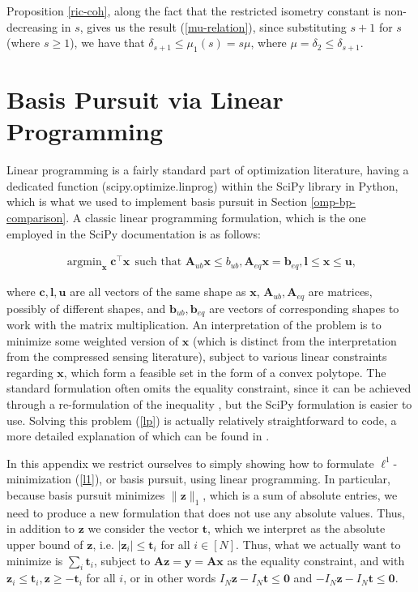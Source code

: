 \documentclass[12pt,a4paper]{amsart}
\numberwithin{equation}{section}
\theoremstyle{plain}
\theoremstyle{definition}
\newcommand{\bdy}{\mathbf{y}}
\newcommand{\bdx}{\mathbf{x}}
\newcommand{\bdz}{\mathbf{z}}
\newcommand{\bdb}{\mathbf{b}}
\newcommand{\bdu}{\mathbf{u}}
\newcommand{\bdc}{\mathbf{c}}
\newcommand{\bdl}{\mathbf{l}}
\newcommand{\bdt}{\mathbf{t}}
\newcommand{\bdA}{\mathbf{A}}
\DeclareMathOperator{\argmin}{argmin}
\begin{document}
\begin{appendices}
Proposition \ref{ric-coh}, along the fact that the restricted isometry constant is non-decreasing in $s$, gives us the result (\ref{mu-relation}), since substituting $s+1$ for $s$ (where $s\geq1$), we have that $\delta_{s+1}\leq\mu_1(s)=s\mu$, where $\mu=\delta_2\leq\delta_{s+1}$.

\section{Basis Pursuit via Linear Programming}\label{lin-prog}

Linear programming is a fairly standard part of optimization literature, having a dedicated function (scipy.optimize.linprog) within the SciPy library in Python, which is what we used to implement basis pursuit in Section \ref{omp-bp-comparison}. A classic linear programming formulation, which is the one employed in the SciPy documentation is as follows:

\begin{align}\label{lp}
    \argmin_\bdx \bdc^\top\bdx \ \ \text{such that }\bdA_{ub}\bdx\leq b_{ub},\bdA_{eq}\bdx=\bdb_{eq},\bdl\leq\bdx\leq\bdu,
\end{align}

where $\bdc,\bdl,\bdu$ are all vectors of the same shape as $\bdx$, $\bdA_{ub},\bdA_{eq}$ are matrices, possibly of different shapes, and $\bdb_{ub},\bdb_{eq}$ are vectors of corresponding shapes to work with the matrix multiplication. An interpretation of the problem is to minimize some weighted version of $\bdx$ (which is distinct from the interpretation from the compressed sensing literature), subject to various linear constraints regarding $\bdx$, which form a feasible set in the form of a convex polytope. The standard formulation often omits the equality constraint, since it can be achieved through a re-formulation of the inequality \cite{chvatal}, but the SciPy formulation is easier to use. Solving this problem (\ref{lp}) is actually relatively straightforward to code, a more detailed explanation of which can be found in \cite{chvatal}.

In this appendix we restrict ourselves to simply showing how to formulate $\ell^1$-minimization (\ref{l1}), or basis pursuit, using linear programming. In particular, because basis pursuit minimizes $\|\bdz\|_1$, which is a sum of absolute entries, we need to produce a new formulation that does not use any absolute values. Thus, in addition to $\bdz$ we consider the vector $\bdt$, which we interpret as the absolute upper bound of $\bdz$, i.e. $|\bdz_i|\leq \bdt_i$ for all $i\in[N]$. Thus, what we actually want to minimize is $\sum_i\bdt_i$, subject to $\bdA\bdz=\bdy=\bdA\bdx$ as the equality constraint, and with $\bdz_i\leq\bdt_i,\bdz\geq-\bdt_i$ for all $i$, or in other words $I_N\bdz-I_N\bdt\leq\mathbf{0}$ and $-I_N\bdz-I_N\bdt\leq\mathbf{0}$.


\end{appendices}
\end{document}
